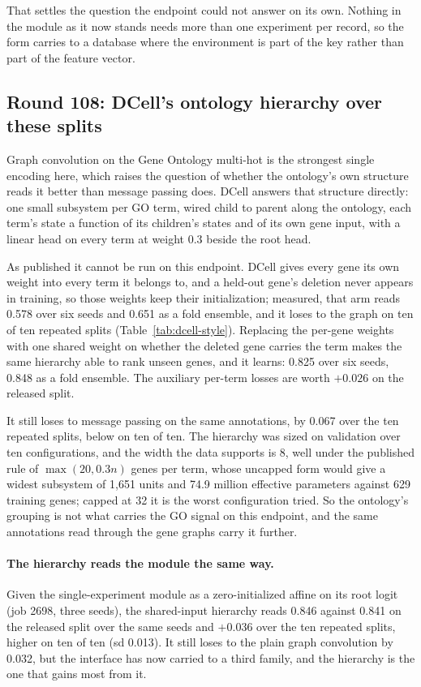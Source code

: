 That settles the question the endpoint could not answer on its own. Nothing in the module
as it now stands needs more than one experiment per record, so the form carries to a
database where the environment is part of the key rather than part of the feature vector.



\subsection{Round 108: DCell's ontology hierarchy over these splits}
\label{sec:round108}

Graph convolution on the Gene Ontology multi-hot is the strongest single encoding here,
which raises the question of whether the ontology's own structure reads it better than
message passing does. DCell answers that structure directly: one small subsystem per GO
term, wired child to parent along the ontology, each term's state a function of its
children's states and of its own gene input, with a linear head on every term at weight
0.3 beside the root head.

As published it cannot be run on this endpoint. DCell gives every gene its own weight
into every term it belongs to, and a held-out gene's deletion never appears in training,
so those weights keep their initialization; measured, that arm reads 0.578 over six
seeds and 0.651 as a fold ensemble, and it loses to the graph on ten of ten repeated
splits (Table~\ref{tab:dcell-style}). Replacing the per-gene weights with one shared
weight on whether the deleted gene carries the term makes the same hierarchy able to rank
unseen genes, and it learns: 0.825 over six seeds, 0.848 as a fold ensemble. The
auxiliary per-term losses are worth $+0.026$ on the released split.

It still loses to message passing on the same annotations, by 0.067 over the ten repeated
splits, below on ten of ten. The hierarchy was sized on validation over ten
configurations, and the width the data supports is 8, well under the published rule of
$\max(20, 0.3 n)$ genes per term, whose uncapped form would give a widest subsystem of
1,651 units and 74.9 million effective parameters against 629 training genes; capped at
32 it is the worst configuration tried. So the ontology's grouping is not what carries
the GO signal on this endpoint, and the same annotations read through the gene graphs
carry it further.

\paragraph{The hierarchy reads the module the same way.} Given the single-experiment
module as a zero-initialized affine on its root logit (job 2698, three seeds), the
shared-input hierarchy reads 0.846 against 0.841 on the released split over the same
seeds and $+0.036$ over the ten repeated splits, higher on ten of ten (sd 0.013). It
still loses to the plain graph convolution by 0.032, but the interface has now carried
to a third family, and the hierarchy is the one that gains most from it.

